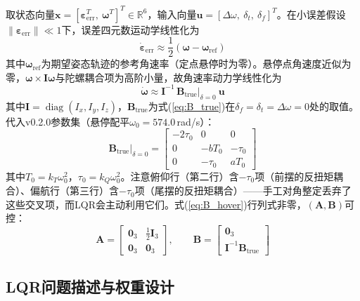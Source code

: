 取状态向量$\mathbf{x}=[\boldsymbol{\varepsilon}_{\mathrm{err}}^T,\ \boldsymbol{\omega}^T]^T\in\mathbb{R}^6$，输入向量$\mathbf{u}=[\Delta\omega,\ \delta_t,\ \delta_f]^T$。在小误差假设$\|\boldsymbol{\varepsilon}_{\mathrm{err}}\|\ll 1$下，误差四元数运动学线性化为
\begin{equation}
    \dot{\boldsymbol{\varepsilon}}_{\mathrm{err}} \approx \frac{1}{2}\left(\boldsymbol{\omega} - \boldsymbol{\omega}_{\mathrm{ref}}\right)
    \label{eq:lqr_eps_dot}
\end{equation}
其中$\boldsymbol{\omega}_{\mathrm{ref}}$为期望姿态轨迹的参考角速率（定点悬停时为零）。悬停点角速度近似为零，$\boldsymbol{\omega}\times\mathbf{I}\boldsymbol{\omega}$与陀螺耦合项为高阶小量，故角速率动力学线性化为
\begin{equation}
    \dot{\boldsymbol{\omega}} \approx \mathbf{I}^{-1}\,\mathbf{B}_{\mathrm{true}}\big|_{\delta=0}\ \mathbf{u}
    \label{eq:lqr_omega_dot}
\end{equation}
其中$\mathbf{I}=\operatorname{diag}(I_x,I_y,I_z)$，$\mathbf{B}_{\mathrm{true}}$为式(\ref{eq:B_true})在$\delta_f=\delta_t=\Delta\omega=0$处的取值。代入v0.2.0参数集（悬停配平$\omega_0=574.0$\,rad/s）：
\begin{equation}
    \mathbf{B}_{\mathrm{true}}\big|_{\delta=0} =
    \begin{bmatrix}
        -2\tau_0 & 0 & 0 \\
        0 & -bT_0 & -\tau_0 \\
        0 & -\tau_0 & aT_0
    \end{bmatrix}
    \label{eq:B_hover}
\end{equation}
其中$T_0=k_T\omega_0^2$，$\tau_0=k_Q\omega_0^2$。注意俯仰行（第二行）含$-\tau_0$项（前摆的反扭矩耦合）、偏航行（第三行）含$-\tau_0$项（尾摆的反扭矩耦合）——手工对角整定丢弃了这些交叉项，而LQR会主动利用它们。式(\ref{eq:B_hover})行列式非零，$(\mathbf{A},\mathbf{B})$可控：
\begin{equation}
    \mathbf{A} = \begin{bmatrix} \mathbf{0}_3 & \frac{1}{2}\mathbf{I}_3 \\ \mathbf{0}_3 & \mathbf{0}_3 \end{bmatrix},
    \qquad
    \mathbf{B} = \begin{bmatrix} \mathbf{0}_3 \\ \mathbf{I}^{-1}\mathbf{B}_{\mathrm{true}} \end{bmatrix}
    \label{eq:lqr_AB}
\end{equation}

\subsection{LQR问题描述与权重设计}
\label{sec:lqr_design}

